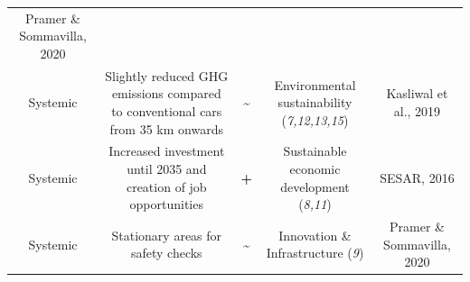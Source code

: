 \documentclass[
]{book}
\begin{document}
\begin{longtable}[]{@{}ccccc@{}}
\begin{minipage}[t]{0.17\columnwidth}
Pramer \& Sommavilla, 2020\strut
\end{minipage}\tabularnewline
\begin{minipage}[t]{0.17\columnwidth}\centering
Systemic\strut
\end{minipage} & \begin{minipage}[t]{0.16\columnwidth}\centering
Slightly reduced GHG emissions compared to conventional cars from 35 km onwards\strut
\end{minipage} & \begin{minipage}[t]{0.17\columnwidth}\centering
\textbf{\textasciitilde{}}\strut
\end{minipage} & \begin{minipage}[t]{0.17\columnwidth}\centering
Environmental sustainability (\emph{7,12,13,15})\strut
\end{minipage} & \begin{minipage}[t]{0.17\columnwidth}\centering
Kasliwal et al., 2019\strut
\end{minipage}\tabularnewline
\begin{minipage}[t]{0.17\columnwidth}\centering
Systemic\strut
\end{minipage} & \begin{minipage}[t]{0.16\columnwidth}\centering
Increased investment until 2035 and creation of job opportunities\strut
\end{minipage} & \begin{minipage}[t]{0.17\columnwidth}\centering
\textbf{+}\strut
\end{minipage} & \begin{minipage}[t]{0.17\columnwidth}\centering
Sustainable economic development (\emph{8,11})\strut
\end{minipage} & \begin{minipage}[t]{0.17\columnwidth}\centering
SESAR, 2016\strut
\end{minipage}\tabularnewline
\begin{minipage}[t]{0.17\columnwidth}\centering
Systemic\strut
\end{minipage} & \begin{minipage}[t]{0.16\columnwidth}\centering
Stationary areas for safety checks\strut
\end{minipage} & \begin{minipage}[t]{0.17\columnwidth}\centering
\textbf{\textasciitilde{}}\strut
\end{minipage} & \begin{minipage}[t]{0.17\columnwidth}\centering
Innovation \& Infrastructure (\emph{9})\strut
\end{minipage} & \begin{minipage}[t]{0.17\columnwidth}\centering
Pramer \& Sommavilla, 2020\strut
\end{minipage}\tabularnewline
\bottomrule
\end{longtable}
\end{document}
